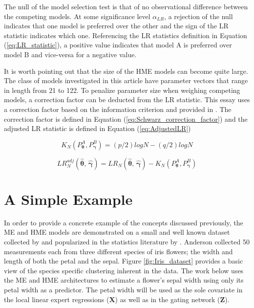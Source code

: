 \documentclass[12pt]{article}
\theoremstyle{definition}
\begin{document}
The null of the model selection test is that of no observational difference
between the competing models. At some significance level $\alpha_{LR}$,
a rejection of the null indicates that one model is preferred over the other
and the sign of the LR statistic indicates which one. Referencing the LR
statistics definition in Equation (\ref{eq:LR_statistic}), a positive 
value indicates that model A is preferred over model B and vice-versa for
a negative value.

It is worth pointing out that the size of the HME models can become quite large.
The class of models investigated in this article have parameter vectors that range
in length from 21 to 122. To penalize parameter size when weighing competing models,
a correction factor can be deducted from the LR statistic. This essay uses a correction 
factor based on the \citet{Schwarz1978} information criterion and provided in \citet{Voung1989}.
The correction factor is defined in Equation (\ref{eq:Schwarz_correction_factor})
and the adjusted LR statistic is defined in Equation (\ref{eq:AdjustedLR})

\begin{equation} \label{eq:Schwarz_correction_factor}
  K_{N}(P^{A}_{\boldsymbol{\theta}}, P^{B}_{\boldsymbol{\gamma}}) = (p / 2) log N - (q / 2) log N
\end{equation}

\begin{equation} \label{eq:AdjustedLR}
  LR_{N}^{adj}(\hat{\boldsymbol{\theta}}, \, \hat{\boldsymbol{\gamma}}) = LR_{N}(\hat{\boldsymbol{\theta}}, \, \hat{\boldsymbol{\gamma}}) - K_{N}(P^{A}_{\boldsymbol{\theta}}, P^{B}_{\boldsymbol{\gamma}})
\end{equation}


\section{A Simple Example} \label{sec:SimpleExample}

In order to provide a concrete example of the concepts discussed previously,
the ME and HME models are demonstrated on a small and well known dataset
collected by \citet{Anderson1936} and popularized in the
statistics literature by \citet{Fisher1936}. Anderson collected
50 measurements each from three different species of iris flowers; the width and
length of both the petal and the sepal. Figure \ref{fig:Iris_dataset} provides a
basic view of the species specific clustering inherent in the data.
The work below uses the ME and HME architectures to estimate a flower's sepal
width using only its petal width as a predictor. The petal width will be used
as the sole covariate in the local linear expert regressions ($\boldsymbol{X}$) as well as
in the gating network ($\boldsymbol{Z}$). 
\end{document}
